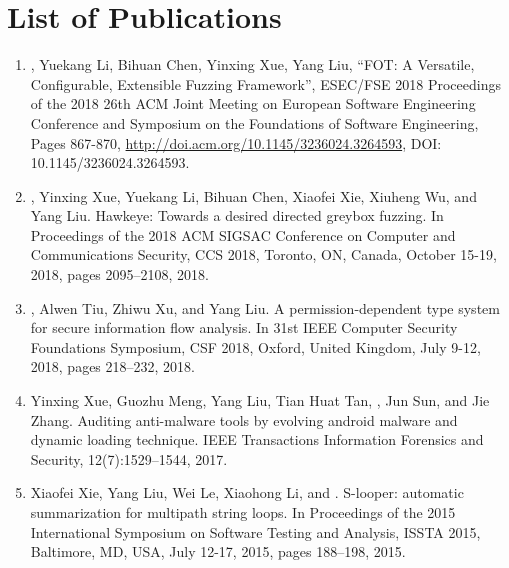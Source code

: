 \chapter{List of Publications} \label{app:paper}

\begin{enumerate}
\item \myname, Yuekang Li, Bihuan Chen, Yinxing Xue, Yang Liu, ``FOT: A Versatile, Configurable, Extensible Fuzzing Framework'', ESEC/FSE 2018 Proceedings of the 2018 26th ACM Joint Meeting on European Software Engineering Conference and Symposium on the Foundations of Software Engineering, Pages 867-870, \url{http://doi.acm.org/10.1145/3236024.3264593}, DOI: 10.1145/3236024.3264593.~\cite{fse18-fot}
\item \myname, Yinxing Xue, Yuekang Li, Bihuan Chen, Xiaofei Xie, Xiuheng Wu, and Yang Liu. Hawkeye: Towards a desired directed greybox fuzzing. In Proceedings of the 2018 ACM SIGSAC Conference on Computer and Communications Security, CCS 2018, Toronto, ON, Canada, October 15-19, 2018, pages 2095–2108, 2018.~\cite{hawkeye}
\item \myname, Alwen Tiu, Zhiwu Xu, and Yang Liu. A permission-dependent type system for secure information flow analysis. In 31st IEEE Computer Security Foundations Symposium, CSF 2018, Oxford, United Kingdom, July 9-12, 2018, pages 218–232, 2018.~\cite{csf18-sta}
\item Yinxing Xue, Guozhu Meng, Yang Liu, Tian Huat Tan, \myname, Jun Sun, and Jie Zhang. Auditing anti-malware tools by evolving android malware and dynamic loading technique. IEEE Transactions Information Forensics and Security, 12(7):1529–1544, 2017.~\cite{meng-tifs}
\item Xiaofei Xie, Yang Liu, Wei Le, Xiaohong Li, and \myname. S-looper: automatic summarization for multipath string loops. In Proceedings of the 2015 International Symposium on Software Testing and Analysis, ISSTA 2015, Baltimore, MD, USA, July 12-17, 2015, pages 188–198, 2015.~\cite{issta15-slooper}
\end{enumerate}
